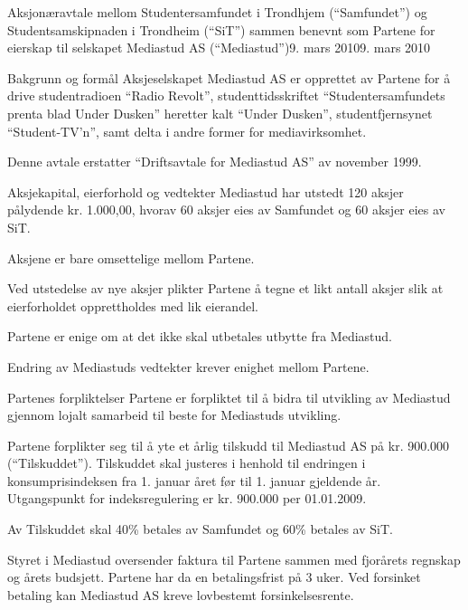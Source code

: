 \begin{instruks}{Aksjonæravtale mellom Studentersamfundet i Trondhjem
(``Samfundet'') og
Studentsamskipnaden i Trondheim (``SiT'') sammen benevnt som Partene for
eierskap til selskapet Mediastud AS (``Mediastud'')}{9. mars 2010}{9. mars 2010}

	\begin{instruksledd}{Bakgrunn og formål }
Aksjeselskapet Mediastud AS er opprettet av Partene for å drive studentradioen
``Radio Revolt'', studenttidsskriftet ``Studentersamfundets prenta blad Under
Dusken'' heretter kalt ``Under Dusken'', studentfjernsynet ``Student-TV’n'', samt
delta i andre former for mediavirksomhet.

Denne avtale erstatter ``Driftsavtale for Mediastud AS'' av november 1999.
	\end{instruksledd}

	\begin{instruksledd}{Aksjekapital, eierforhold og vedtekter}
	Mediastud har utstedt 120 aksjer pålydende kr. 1.000,00, hvorav 60
	aksjer eies av Samfundet og 60 aksjer eies av SiT.
	
	Aksjene er bare omsettelige mellom Partene.

	Ved utstedelse av nye aksjer plikter Partene å tegne et likt antall
	aksjer slik at eierforholdet opprettholdes med lik eierandel. 
	
	Partene er enige om at det ikke skal utbetales utbytte fra Mediastud.
	
	Endring av Mediastuds vedtekter krever enighet mellom Partene. 
	\end{instruksledd}

	\begin{instruksledd}{Partenes forpliktelser}
	Partene er forpliktet til å bidra til utvikling av Mediastud gjennom
	lojalt samarbeid til beste for Mediastuds utvikling. 

	Partene forplikter seg til å yte et årlig tilskudd til Mediastud AS på
	kr. 900.000 (``Tilskuddet''). Tilskuddet skal justeres i henhold til
	endringen i konsumprisindeksen fra 1. januar året før til 1. januar
	gjeldende år. Utgangspunkt for indeksregulering er kr. 900.000 per
	01.01.2009.

	Av Tilskuddet skal 40\% betales av Samfundet og 60\% betales av SiT. 
	
	Styret i Mediastud oversender faktura til Partene sammen med fjorårets
	regnskap og årets budsjett. Partene har da en betalingsfrist på 3 uker.
	Ved forsinket betaling kan Mediastud AS kreve lovbestemt
	forsinkelsesrente. 


\end{instruksledd}
\end{instruks}
